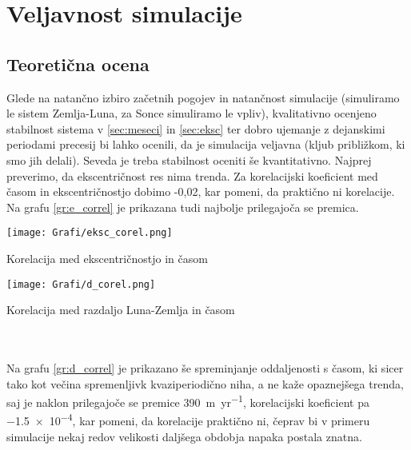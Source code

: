 \documentclass{article}
\begin{document}
\section{Veljavnost simulacije}
\subsection{Teoretična ocena}
Glede na natančno izbiro začetnih pogojev in natančnost simulacije (simuliramo le sistem Zemlja-Luna, za Sonce simuliramo le vpliv), kvalitativno ocenjeno stabilnost sistema v \ref{sec:meseci} in \ref{sec:eksc} ter dobro ujemanje z dejanskimi periodami precesij bi lahko ocenili, da je simulacija veljavna (kljub približkom, ki smo jih delali). Seveda je treba stabilnost oceniti še kvantitativno. Najprej preverimo, da ekscentričnost res nima trenda. Za korelacijski koeficient med časom in ekscentričnostjo dobimo {-0,02}, kar pomeni, da praktično ni korelacije. Na grafu \ref{gr:e_correl} je prikazana tudi najbolje prilegajoča se premica.

\begin{minipage}[t]{0.45\textwidth}
    \begin{graph}
        \centering
        \texttt{[image: Grafi/eksc\_corel.png]}
        \captionsetup{width=0.8\linewidth}
        \caption{Korelacija med ekscentričnostjo in časom}
        \label{gr:e_correl}
    \end{graph}
\end{minipage}\begin{minipage}[t]{0.45\textwidth}
    \begin{graph}
        \centering
        \texttt{[image: Grafi/d\_corel.png]}
        \captionsetup{width=0.8\linewidth}
        \caption{Korelacija med razdaljo Luna-Zemlja in časom}
        \label{gr:d_correl}
    \end{graph}
\end{minipage}\\\\

Na grafu \ref{gr:d_correl} je prikazano še spreminjanje oddaljenosti s časom, ki sicer tako kot večina spremenljivk kvaziperiodično niha, a ne kaže opaznejšega trenda, saj je naklon prilegajoče se premice \SI{390}{\meter \per yr}, korelacijski koeficient pa \SI{-1,5e-4}{}, kar pomeni, da korelacije praktično ni, čeprav bi v primeru simulacije nekaj redov velikosti daljšega obdobja napaka postala znatna.
\end{document}
